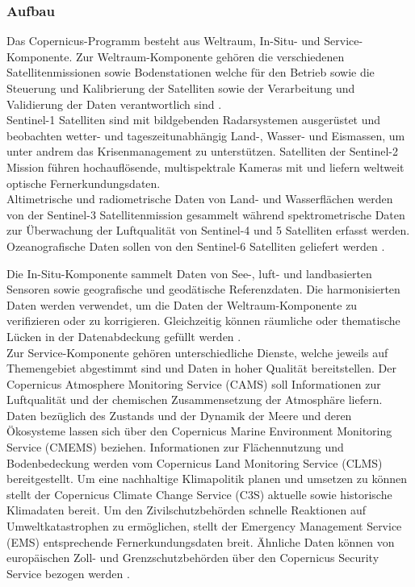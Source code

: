 \subsubsection{Aufbau}
Das Copernicus-Programm besteht aus Weltraum, In-Situ- und Service-Komponente. 
Zur Weltraum-Komponente gehören die verschiedenen Satellitenmissionen sowie Bodenstationen welche für den Betrieb sowie die Steuerung und Kalibrierung der 
Satelliten sowie der Verarbeitung und Validierung der Daten verantwortlich sind \cite{copernicus_regulation}. \\ 
Sentinel-1 Satelliten sind mit bildgebenden Radarsystemen ausgerüstet und beobachten wetter- und tageszeitunabhängig Land-, Wasser- und Eismassen, um unter andrem das 
Krisenmanagement zu unterstützen.
Satelliten der Sentinel-2 Mission führen hochauflösende, multispektrale Kameras mit und liefern weltweit optische Fernerkundungsdaten. \\
Altimetrische und radiometrische Daten von Land- und Wasserflächen werden von der Sentinel-3 Satellitenmission gesammelt während spektrometrische Daten zur 
Überwachung der Luftqualität von Sentinel-4 und 5 Satelliten erfasst werden.
Ozeanografische Daten sollen von den Sentinel-6 Satelliten geliefert werden \cite{sentinel_overview}.

Die In-Situ-Komponente sammelt Daten von See-, luft- und landbasierten Sensoren sowie geografische und geodätische Referenzdaten. Die harmonisierten Daten 
werden verwendet, um die Daten der Weltraum-Komponente zu verifizieren oder zu korrigieren. Gleichzeitig können räumliche oder thematische Lücken in der 
Datenabdeckung gefüllt werden \cite{copernicus_regulation}\cite{what_is_copernicus}. \\

Zur Service-Komponente gehören unterschiedliche Dienste, welche jeweils auf Themengebiet abgestimmt sind und Daten in hoher Qualität bereitstellen.
Der Copernicus Atmosphere Monitoring Service (CAMS) soll Informationen zur Luftqualität und der chemischen Zusammensetzung der Atmosphäre liefern. 
Daten bezüglich des Zustands und der Dynamik der Meere und deren Ökosysteme lassen sich über den Copernicus Marine Environment Monitoring Service (CMEMS) beziehen. 
Informationen zur Flächennutzung und Bodenbedeckung werden vom Copernicus Land Monitoring Service (CLMS) bereitgestellt. 
Um eine nachhaltige Klimapolitik planen und umsetzen zu können stellt der Copernicus Climate Change Service (C3S) aktuelle sowie historische Klimadaten bereit.  
Um den Zivilschutzbehörden schnelle Reaktionen auf Umweltkatastrophen zu ermöglichen, stellt der Emergency Management Service (EMS) entsprechende Fernerkundungsdaten 
breit. Ähnliche Daten können von europäischen Zoll- und Grenzschutzbehörden über den Copernicus Security Service bezogen werden
\cite{copernicus_regulation}\cite{what_is_copernicus}.

